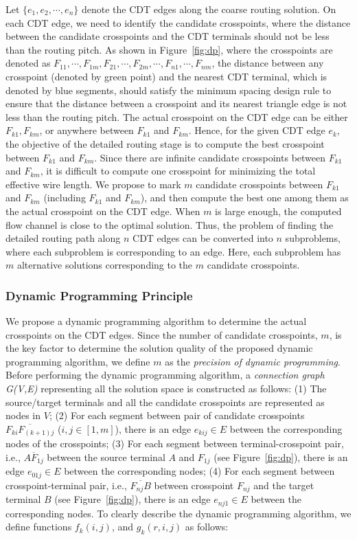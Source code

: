 \documentclass[journal]{IEEEtran}
\begin{document}
Let $\{e_1, e_2, \cdots, e_n\}$ denote the CDT edges along the coarse routing solution. 
On each CDT edge, we need to identify the candidate crosspoints, where the distance between the candidate crosspoints and the CDT terminals should not be less than the routing pitch. 
As shown in Figure~\ref{fig:dp}, where the crosspoints are denoted as $F_{11}, \cdots, F_{1m}, F_{21}, \cdots, F_{2m}, \cdots, F_{n1}, \cdots, F_{nm}$,  the distance between any crosspoint (denoted by green point) and the nearest CDT terminal, which is denoted by blue segments, should satisfy the minimum spacing design rule to ensure that the distance between a crosspoint and its nearest triangle edge is not less than the routing pitch.
The actual crosspoint on the CDT edge can be either $F_{k1}, F_{km}$, or anywhere between $F_{k1}$ and $F_{km}$. 
Hence, for the given CDT edge $e_k$, the objective of the detailed routing stage is to compute the best crosspoint between $F_{k1}$ and $F_{km}$. 
Since there are infinite candidate crosspoints between $F_{k1}$ and $F_{km}$, it is difficult to compute one crosspoint for minimizing the total effective wire
length.
We propose to mark $m$ candidate crosspoints between $F_{k1}$ and $F_{km}$ (including $F_{k1}$ and $F_{km}$), and then compute the best one among them as the actual crosspoint on the CDT edge. 
When $m$ is large enough, the computed flow channel is close to the optimal solution.
Thus, the problem of finding the detailed routing path along $n$ CDT edges can be converted into $n$ subproblems, where each subproblem is corresponding to an edge.
Here, each subproblem has $m$ alternative solutions corresponding to the $m$ candidate crosspoints. 

\subsubsection{Dynamic Programming Principle}

We propose a dynamic programming algorithm to determine the actual crosspoints on the CDT edges.
Since the number of candidate crosspoints, $m$, is the key factor to determine the solution quality of the proposed dynamic programming algorithm, we define $m$ as the {\em precision of dynamic programming}. 
Before performing the dynamic programming algorithm, a {\em connection graph G(V,E)} representing all the solution space is constructed as follows: (1) The source/target terminals and all the candidate crosspoints are represented as nodes in $V$; (2) For each segment between pair of candidate crosspoints $\overline{F_{ki}F_{(k+1)j}}$ ($i,j \in [1,m]$), there is an edge $e_{kij} \in E$ between the corresponding nodes of the crosspoints; (3) For each segment between terminal-crosspoint pair, i.e., $\overline{AF_{1j}}$ between the source terminal $A$ and $F_{1j}$ (see Figure~\ref{fig:dp}), there is an edge $e_{01j} \in E$ between the corresponding nodes; (4) For each segment between crosspoint-terminal pair, i.e., $\overline{F_{nj}B}$ between crosspoint $F_{nj}$ and the target terminal $B$ (see Figure~\ref{fig:dp}), there is an edge $e_{nj1} \in E$ between the corresponding nodes. To clearly describe the dynamic programming algorithm, we define functions $f_k(i, j)$, and $g_k(r, i, j)$ as follows:
\end{document}
